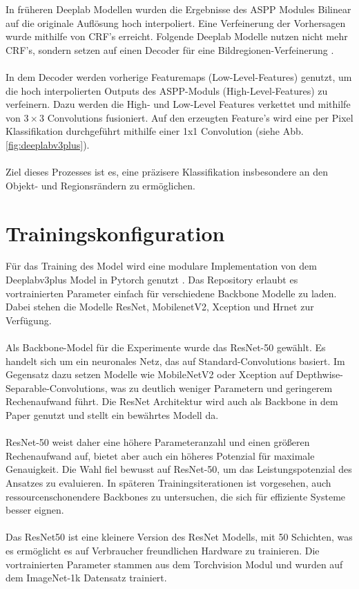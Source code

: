 \documentclass[12pt,DIV=15,BCOR=15mm,twoside,headsepline,abstract=true,listof=totoc,bibliography=totoc]{scrreprt}
\theoremstyle{remark}    %
\begin{document}
    In früheren Deeplab Modellen wurden die Ergebnisse des \ac{ASPP} Modules Bilinear auf die originale
    Auflösung hoch interpoliert. Eine Verfeinerung der Vorhersagen wurde mithilfe von CRF's erreicht. 
    Folgende Deeplab Modelle nutzen nicht mehr CRF's, sondern setzen auf einen Decoder
    für eine Bildregionen-Verfeinerung \cite{chen2018encoderdecoderatrousseparableconvolution,chen2017rethinkingatrousconvolutionsemantic}.\\\\
    In dem Decoder werden vorherige Featuremaps (Low-Level-Features) genutzt, um die hoch interpolierten Outputs des \ac{ASPP}-Moduls (High-Level-Features) 
    zu verfeinern. Dazu werden die High- und Low-Level Features verkettet und mithilfe von $3\times3$ Convolutions fusioniert. 
    Auf den erzeugten Feature's wird eine per Pixel Klassifikation durchgeführt mithilfe einer 1x1 Convolution (siehe Abb. \ref{fig:deeplabv3plus}).\\\\
    Ziel dieses Prozesses ist es, eine präzisere Klassifikation insbesondere an den Objekt- und Regionsrändern zu ermöglichen.

    \section{Trainingskonfiguration}
    Für das Training des Model wird eine modulare Implementation von dem Deeplabv3plus Model in Pytorch genutzt \cite{Deeplabv3plus_PyTorch}. Das 
    Repository erlaubt es vortrainierten Parameter einfach für verschiedene Backbone Modelle zu laden. Dabei stehen die Modelle ResNet, MobilenetV2, 
    Xception und Hrnet zur Verfügung.\\\\
    Als Backbone-Model für die Experimente wurde das ResNet-50 gewählt. Es handelt sich um ein neuronales Netz, das auf Standard-Convolutions basiert.
    Im Gegensatz dazu setzen Modelle wie MobileNetV2 oder Xception auf Depthwise-Separable-Convolutions, was zu deutlich weniger Parametern und geringerem 
    Rechenaufwand führt. Die ResNet Architektur wird auch als Backbone in dem Paper \cite{chen2017rethinkingatrousconvolutionsemantic,HaitzHuebnerUlrich2022} 
    genutzt und stellt ein bewährtes Modell da.\\\\
    ResNet-50 weist daher eine höhere Parameteranzahl und einen größeren Rechenaufwand auf, bietet aber auch ein höheres Potenzial für 
    maximale Genauigkeit. Die Wahl fiel bewusst auf ResNet-50, um das Leistungspotenzial des Ansatzes zu evaluieren. In späteren Trainingsiterationen ist vorgesehen, 
    auch ressourcenschonendere Backbones zu untersuchen, die sich für effiziente Systeme besser eignen.\\\\
    Das ResNet50 ist eine kleinere Version des ResNet Modells, mit 50 Schichten, was es ermöglicht es auf Verbraucher freundlichen Hardware zu trainieren. Die 
    vortrainierten Parameter stammen aus dem Torchvision Modul und wurden auf dem ImageNet-1k Datensatz \cite{deng2009imagenet} trainiert.
\end{document}
